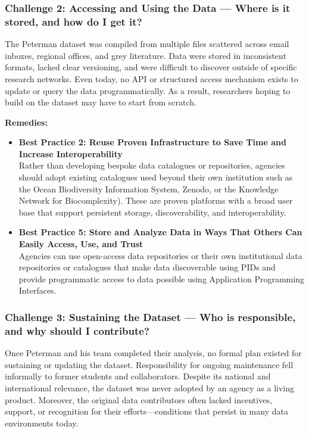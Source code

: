 \documentclass[
  letterpaper,
  DIV=11,
  numbers=noendperiod]{scrartcl}
\begin{document}
\subsubsection{Challenge 2: Accessing and Using the Data --- Where is it
stored, and how do I get
it?}\label{challenge-2-accessing-and-using-the-data-where-is-it-stored-and-how-do-i-get-it}

The Peterman dataset was compiled from multiple files scattered across
email inboxes, regional offices, and grey literature. Data were stored
in inconsistent formats, lacked clear versioning, and were difficult to
discover outside of specific research networks. Even today, no API or
structured access mechanism exists to update or query the data
programmatically. As a result, researchers hoping to build on the
dataset may have to start from scratch.

\textbf{Remedies:}

\begin{itemize}
\item
  \textbf{Best Practice 2: Reuse Proven Infrastructure to Save Time and
  Increase Interoperability}\\
  Rather than developing bespoke data catalogues or repositories,
  agencies should adopt existing catalogues used beyond their own
  institution such as the Ocean Biodiversity Information System, Zenodo,
  or the Knowledge Network for Biocomplexity). These are proven
  platforms with a broad user base that support persistent storage,
  discoverability, and interoperability.
\item
  \textbf{Best Practice 5: Store and Analyze Data in Ways That Others
  Can Easily Access, Use, and Trust}\\
  Agencies can use open-access data repositories or their own
  institutional data repositories or catalogues that make data
  discoverable using PIDs and provide programmatic access to data
  possible using Application Programming Interfaces.
\end{itemize}

\subsubsection{Challenge 3: Sustaining the Dataset --- Who is
responsible, and why should I
contribute?}\label{challenge-3-sustaining-the-dataset-who-is-responsible-and-why-should-i-contribute}

Once Peterman and his team completed their analysis, no formal plan
existed for sustaining or updating the dataset. Responsibility for
ongoing maintenance fell informally to former students and
collaborators. Despite its national and international relevance, the
dataset was never adopted by an agency as a living product. Moreover,
the original data contributors often lacked incentives, support, or
recognition for their efforts---conditions that persist in many data
environments today.
\end{document}
